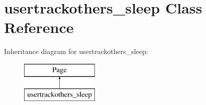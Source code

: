 \hypertarget{classusertrackothers__sleep}{\section{usertrackothers\-\_\-sleep Class Reference}
\label{classusertrackothers__sleep}
}
Inheritance diagram for usertrackothers\-\_\-sleep\-:\begin{figure}[H]
\begin{center}
\leavevmode
\includegraphics[height=2.000000cm]{classusertrackothers__sleep}
\end{center}
\end{figure}
